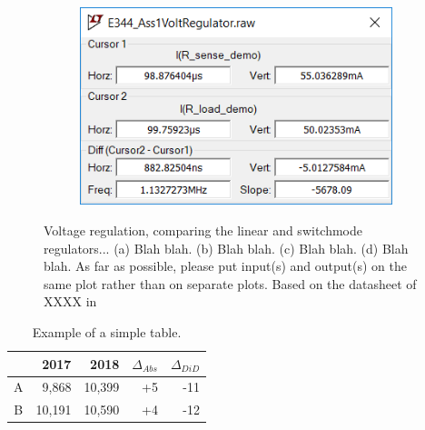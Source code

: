\begin{figure}
\begin{subfigure}[]{0.55\textwidth}
		    \caption{} \label{subfig:pwr_simu_rect}
     \end{subfigure}
    \begin{subfigure}[]{0.4\textwidth}
              \centering
  		\includegraphics[width=1\linewidth]{./Figures/Screengrab2}
		    \caption{} \label{subfig:pwr_simu_rect}
     \end{subfigure}
   \caption[\textcolor{red}{I am the short caption that appears in the List of Figures list}]{Voltage regulation, comparing the linear and switchmode regulators... (a)  Blah blah. (b)  Blah blah.  (c)  Blah blah. (d) Blah blah.   As far as possible, please put input(s) and output(s) on the same plot rather than on separate plots. Based on the datasheet of XXXX in \cite{WebsiteOpAmp}}
    \label{fig:simulation_results_box}
 \end{figure}



\begin{table}
        \centering
        \footnotesize
        \caption{Example of a simple table.}
         \begin{tabular}{c@{\qquad}rrrr}
          \toprule
             & 2017 & 2018 & $\Delta_{Abs}$ & $\Delta_{DiD}$\\
          \midrule
          A & 9,868      & 10,399 & +5 & -11\\
          B & 10,191     & 10,590 & +4 & -12\\
          \bottomrule
        \end{tabular}
     \label{tab:table1}
\end{table}


